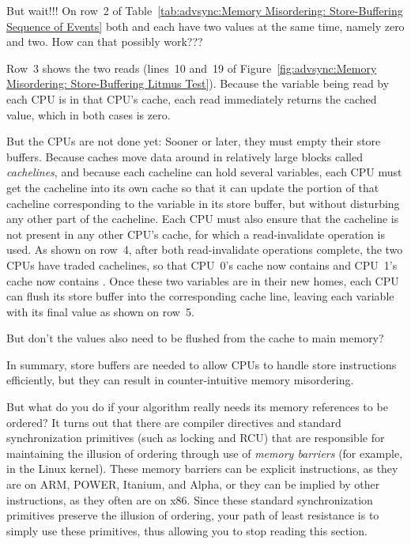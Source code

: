 \QuickQuiz{}
	But wait!!!
	On row~2 of
	Table~\ref{tab:advsync:Memory Misordering: Store-Buffering Sequence of Events}
	both  and  each have two values at the same time,
	namely zero and two.
	How can that possibly work???
 \QuickQuizEnd

Row~3 shows the two reads (lines~10 and~19 of
Figure~\ref{fig:advsync:Memory Misordering: Store-Buffering Litmus Test}).
Because the variable being read by each CPU is in that CPU's cache,
each read immediately returns the cached value, which in both cases
is zero.

But the CPUs are not done yet: Sooner or later, they must empty their
store buffers.
Because caches move data around in relatively large blocks called
\emph{cachelines}, and because each cacheline can hold several
variables, each CPU must get the cacheline into its own cache so
that it can update the portion of that cacheline corresponding
to the variable in its store buffer, but without disturbing any
other part of the cacheline.
Each CPU must also ensure that the cacheline is not present in any other
CPU's cache, for which a read-invalidate operation is used.
As shown on row~4, after both read-invalidate operations complete,
the two CPUs have traded cachelines, so that CPU~0's cache now contains
 and CPU~1's cache now contains .
Once these two variables are in their new homes, each CPU can flush
its store buffer into the corresponding cache line, leaving each
variable with its final value as shown on row~5.

\QuickQuiz{}
	But don't the values also need to be flushed from the cache
	to main memory?
 \QuickQuizEnd

In summary, store buffers are needed to allow CPUs to handle
store instructions efficiently, but they can result in
counter-intuitive memory misordering.

But what do you do if your algorithm really needs its memory
references to be ordered?
It turns out that there are compiler directives and standard
synchronization primitives (such as locking and RCU)
that are responsible for maintaining the illusion of ordering through use of
\emph{memory barriers} (for example,  in the Linux kernel).
These memory barriers can be explicit instructions, as they are on
ARM, POWER, Itanium, and Alpha, or they can be implied by other instructions,
as they often are on x86.
Since these standard synchronization primitives preserve the illusion of
ordering, your path of least resistance is to simply use these primitives,
thus allowing you to stop reading this section.


